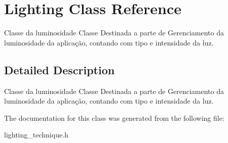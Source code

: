 \hypertarget{classLighting}{\section{Lighting Class Reference}
\label{classLighting}
}


Classe da luminosidade Classe Destinada a parte de Gerenciamento da luminosidade da aplicação, contando com tipo e intensidade da luz.  




\subsection{Detailed Description}
Classe da luminosidade Classe Destinada a parte de Gerenciamento da luminosidade da aplicação, contando com tipo e intensidade da luz. 

The documentation for this class was generated from the following file\-:\begin{DoxyCompactItemize}
\item 
lighting\-\_\-technique.\-h\end{DoxyCompactItemize}
